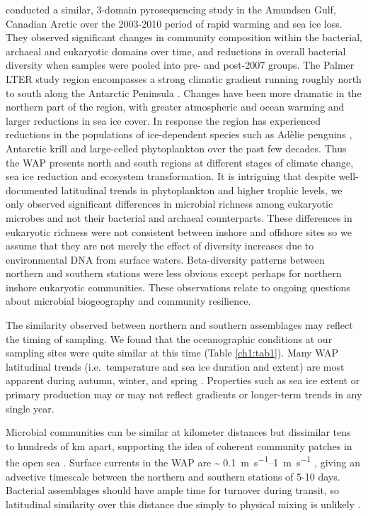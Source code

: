 \citet{cltcl11} conducted a similar, 3-domain pyrosequencing study in the Amundsen Gulf, Canadian Arctic over the 2003-2010 period of rapid warming and sea ice loss. They observed significant changes in community composition within the bacterial, archaeal and eukaryotic domains over time, and reductions in overall bacterial diversity when samples were pooled into pre- and post-2007 groups. The Palmer LTER study region encompasses a strong climatic gradient running roughly north to south along the Antarctic Peninsula \citep{msisv08,smsi08}. Changes have been more dramatic in the northern part of the region, with greater atmospheric and ocean warming \citep{mk05} and larger reductions in sea ice cover. In response the region has experienced reductions in the populations of ice-dependent species such as Adèlie penguins \citep{dcddghmmmms12}, Antarctic krill \citep{aspr04} and large-celled phytoplankton \citep{mddfmss09} over the past few decades. Thus the WAP presents north and south regions at different stages of climate change, sea ice reduction and ecosystem transformation. It is intriguing that despite well-documented latitudinal trends in phytoplankton and higher trophic levels, we only observed significant differences in microbial richness among eukaryotic microbes and not their bacterial and archaeal counterparts. These differences in eukaryotic richness were not consistent between inshore and offshore sites so we assume that they are not merely the effect of diversity increases due to environmental DNA from surface waters. Beta-diversity patterns between northern and southern stations were less obvious except perhaps for northern inshore eukaryotic communities. These observations relate to ongoing questions about microbial biogeography and community resilience.

The similarity observed between northern and southern assemblages may reflect the timing of sampling. We found that the oceanographic conditions at our sampling sites were quite similar at this time (Table \ref{ch1:tab1}). Many WAP latitudinal trends (i.e.~temperature and sea ice duration and extent) are most apparent during autumn, winter, and spring \citep{dcddghmmmms12}. Properties such as sea ice extent or primary production may or may not reflect gradients or longer-term trends in any single year.

Microbial communities can be similar at kilometer distances but dissimilar tens to hundreds of km apart, supporting the idea of coherent community patches in the open sea \citep{hscf06,mncawa12}. Surface currents in the WAP are \textasciitilde{} \SIrange{0.1}{1}{\meter \per\second} \citep{sa09}, giving an advective timescale between the northern and southern stations of 5-10 days. Bacterial assemblages should have ample time for turnover during transit, so latitudinal similarity over this distance due simply to physical mixing is unlikely \citep{wvrlc13}.

